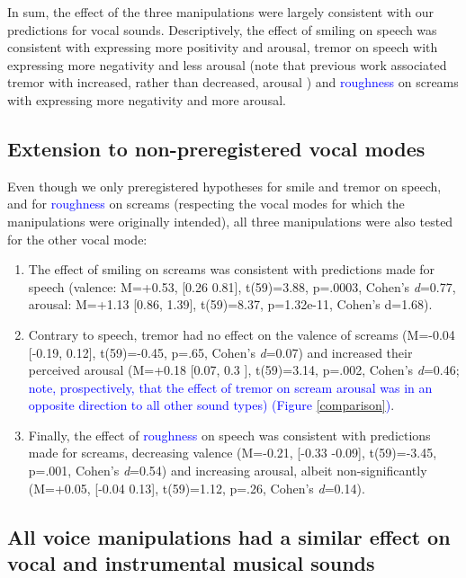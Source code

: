 \documentclass[openacc]{rsprocb_new}%
\begin{document}
In sum, the effect of the three manipulations were largely consistent with our predictions for vocal sounds. Descriptively, the effect of smiling on speech was consistent with expressing more positivity and arousal, tremor on speech with expressing more negativity and less arousal (note that previous work associated tremor with increased, rather than decreased, arousal \cite{RACH17, AUC16}) and \textcolor{blue}{roughness} on screams with expressing more negativity and more arousal.

\subsection{Extension to non-preregistered vocal modes}

Even though we only preregistered hypotheses for smile and tremor on speech, and for \textcolor{blue}{roughness} on screams (respecting the vocal modes for which the manipulations were originally intended),  all three manipulations were also tested for the other vocal mode:  

\begin{enumerate}
    \item The effect of smiling on screams was consistent with predictions made for speech (valence: M=+0.53, [0.26 0.81], t(59)=3.88, p=.0003, Cohen's \emph{d}=0.77, arousal: M=+1.13 [0.86, 1.39], t(59)=8.37, p=1.32e-11, Cohen's d=1.68). 

    \item Contrary to speech, tremor had no effect on the valence of screams (M=-0.04 [-0.19, 0.12], t(59)=-0.45, p=.65, Cohen's \emph{d}=0.07) and increased their perceived arousal (M=+0.18 [0.07, 0.3 ], t(59)=3.14, p=.002, Cohen's \emph{d}=0.46;  \textcolor{blue}{note, prospectively, that the effect of tremor on scream arousal was in an opposite direction to all other sound types) (Figure \ref{comparison})}. 

    \item Finally, the effect of \textcolor{blue}{roughness} on speech was consistent with predictions made for screams, decreasing valence (M=-0.21, [-0.33 -0.09], t(59)=-3.45, p=.001, Cohen's \emph{d}=0.54) and increasing arousal, albeit non-significantly (M=+0.05, [-0.04  0.13], t(59)=1.12, p=.26, Cohen's \emph{d}=0.14). 
\end{enumerate}

\subsection{All voice manipulations had a similar effect on vocal and instrumental musical sounds}
\end{document}
